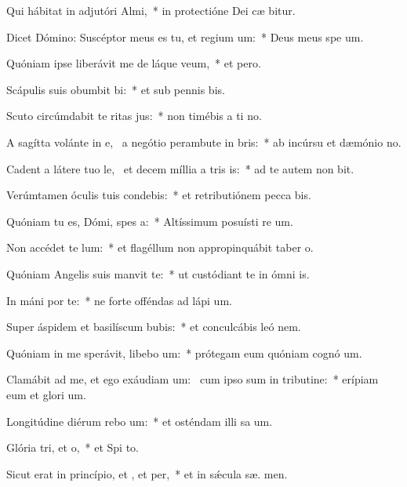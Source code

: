 \item Qui hábitat in adjutóri Almi,~* in protectióne Dei cæ bitur.
\item Dicet Dómino: Suscéptor meus es tu, et regium um:~* Deus meus spe  um.
\item Quóniam ipse liberávit me de láque veum,~* et   pero.
\item Scápulis suis obumbit bi:~* et sub pennis  bis.
\item Scuto circúmdabit te ritas jus:~* non timébis a ti no.
\item A sagítta volánte in e,~\pscross{} a negótio perambute in bris:~* ab incúrsu et dæmónio no.
\item Cadent a látere tuo le,~\pscross{} et decem míllia a tris is:~* ad te autem non bit.
\item Verúmtamen óculis tuis condebis:~* et retributiónem pecca bis.
\item Quóniam tu es, Dómi, spes a:~* Altíssimum posuísti re um.
\item Non accédet  te lum:~* et flagéllum non appropinquábit taber o.
\item Quóniam Angelis suis manvit  te:~* ut custódiant te in ómni  is.
\item In máni por te:~* ne forte offéndas ad lápi  um.
\item Super áspidem et basilíscum bubis:~* et conculcábis leó  nem.
\item Quóniam in me sperávit, libebo um:~* prótegam eum quóniam cognó  um.
\item Clamábit ad me, et ego exáudiam um:~\pscross{} cum ipso sum in tributine:~* erípiam eum et glori um.
\item Longitúdine diérum rebo um:~* et osténdam illi sa um.
\item Glória tri, et o,~* et Spi to.
\item Sicut erat in princípio, et , et per,~* et in sǽcula sæ. men.
